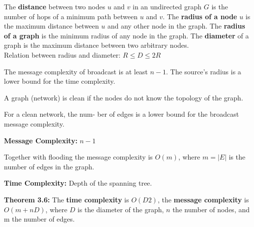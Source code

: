 {
	The {\bf distance} between two nodes $u$ and $v$ in an undirected graph $G$ is
	the number of hops of a minimum path between $u$ and $v$. The {\bf radius of a
	node} $u$ is the maximum distance between $u$ and any other node in the graph.
	The {\bf radius of a graph} is the minimum radius of any node in the graph. The
	{\bf diameter} of a graph is the maximum distance between two arbitrary
	nodes.\\
	Relation between radius and diameter: $R \leq D \leq 2R$ 
}

{
	The message complexity of broadcast is at least $n-1$. The source's radius is
	a lower bound for the time complexity.
}

{
	A graph (network) is clean if the nodes do not know the topology of the graph.
}

{
	For a clean network, the num- ber of edges is a lower bound for the broadcast
	message complexity.
}

{
	\begin{items}
		\item
	\end{items}
}

{
	\begin{items}
		\item {\bf Message Complexity: } $n-1$
		\item Together with flooding the message complexity is $O(m)$, where $m=|E|$
		is the number of edges in the graph.
		\item {\bf Time Complexity: } Depth of the spanning tree.
	\end{items}
}

{
	\begin{items}
		\item {\bf Theorem 3.6:} The {\bf time complexity} is $O(D2)$, the
		{\bf message complexity} is $O(m + nD)$, where $D$ is the diameter of the
		graph, $n$ the number of nodes, and m the number of edges.
	\end{items}
}












